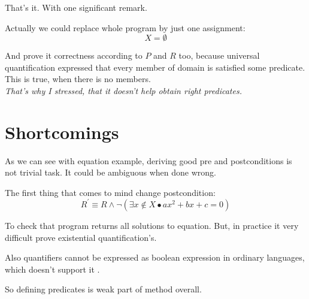 \documentclass[twoside,twocolumn]{article}
\begin{document}
\rightline{{\rm $\Box$}}
\vspace{1em}

That's it. With one significant remark.

Actually we could replace whole program
by just one assignment: 
$$ X = \emptyset $$

And prove it correctness according to $P$ and $R$ too, because universal
quantification expressed that every member of domain is satisfied some
predicate. This is true, when there is no members. \\

\textit{That's why I stressed, that it doesn't help obtain right predicates. }





\section{Shortcomings}

As we can see with equation example, deriving good pre and postconditions is not
trivial task. It could be ambiguous when done wrong.

The first thing that comes to mind change postcondition:
$$ R^\prime \equiv R \wedge \neg(\exists x \not\in X \bullet ax^2 + bx + c = 0)$$

To check that program returns all solutions to equation. But, in practice it
very difficult prove existential quantification's.

Also quantifiers cannot be expressed as boolean expression in ordinary
languages, which doesn't support it \cite{meyer:90}.

So defining predicates is weak part of method overall.


\end{document}
